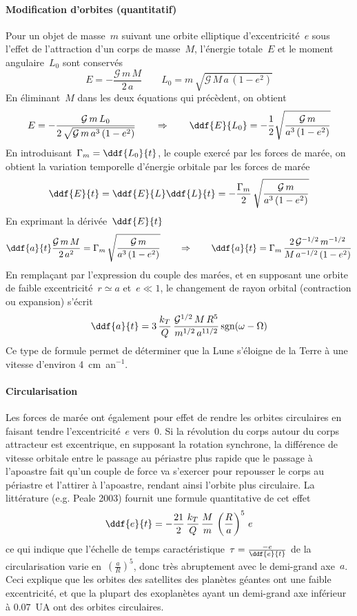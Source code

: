 \sk
\paragraph{Modification d'orbites (quantitatif)} Pour un objet de masse~$m$ suivant une orbite elliptique d'excentricité~$e$ sous l'effet de l'attraction d'un corps de masse~$M$, l'énergie totale~$E$ et le moment angulaire~$L_0$ sont conservés
\[  E = - \frac{\mathcal{G}\,m\,M}{2\,a} \qquad L_0 = m \, \sqrt{\mathcal{G}\,M\,a\,(1-e^2)} \] 
En éliminant~$M$ dans les deux équations qui précèdent, on obtient
\[ E = - \frac{\mathcal{G}\,m\,L_0}{2\,\sqrt{\mathcal{G} \, m \, a^3 \, (1-e^2)}} \qquad \Rightarrow \qquad \ddf{E}{L_0} = - \frac{1}{2} \sqrt{ \frac{\mathcal{G}\,m}{a^3 \, (1-e^2)} } \]
En introduisant~$\Gamma_m = \ddf{L_0}{t}$, le couple exercé par les forces de marée, on obtient la variation temporelle d'énergie orbitale par les forces de marée
\[ \ddf{E}{t} = \ddf{E}{L} \ddf{L}{t} = - \frac{\Gamma_m}{2} \, \sqrt{ \frac{\mathcal{G}\,m}{a^3 \, (1-e^2) } } \]
\noindent En exprimant la dérivée~$\ddf{E}{t}$
\[
\ddf{a}{t} \frac{\mathcal{G}\,m\,M}{2\,a^2} = \Gamma_m \, \sqrt{ \frac{\mathcal{G}\,m}{a^3 \, (1-e^2) } }
\qquad \Rightarrow \qquad
\ddf{a}{t} = \Gamma_m \, \frac{2\,\mathcal{G}^{-1/2}\,m^{-1/2}}{M \, a^{-1/2} \, (1-e^2) }
\]
\noindent En remplaçant par l'expression du couple des marées, et en supposant une orbite de faible excentricité~$r \simeq a$ et~$e \ll 1$, le changement de rayon orbital (contraction ou expansion) s'écrit
\[
\ddf{a}{t} = 3 \, \frac{k_T}{Q} \, \frac{\mathcal{G}^{1/2}\,M\,R^5}{m^{1/2} \, a^{11/2} } \, \textrm{sgn}(\omega-\Omega)
\]
Ce type de formule permet de déterminer que la Lune s'éloigne de la Terre à une vitesse d'environ 4~cm~an$^{-1}$.

\sk
\paragraph{Circularisation} Les forces de marée ont également pour effet de rendre les orbites circulaires en faisant tendre l'excentricité~$e$ vers~$0$. Si la révolution du corps autour du corps attracteur est excentrique, en supposant la rotation synchrone, la différence de vitesse orbitale entre le passage au périastre plus rapide que le passage à l'apoastre fait qu'un couple de force va s'exercer pour repousser le corps au périastre et l'attirer à l'apoastre, rendant ainsi l'orbite plus circulaire. La littérature (e.g. Peale 2003) fournit une formule quantitative de cet effet
\[ \ddf{e}{t} = - \frac{21}{2} \, \frac{k_T}{Q} \, \frac{M}{m} \, \left( \frac{R}{a} \right)^5 \, e  \]
\noindent ce qui indique que l'échelle de temps caractéristique~$\tau = \frac{-e}{\ddf{e}{t}} $ de la circularisation varie en~$\left( \frac{a}{R} \right)^5$, donc très abruptement avec le demi-grand axe~$a$. Ceci explique que les orbites des satellites des planètes géantes ont une faible excentricité, et que la plupart des exoplanètes ayant un demi-grand axe inférieur à $0.07$~UA ont des orbites circulaires.
